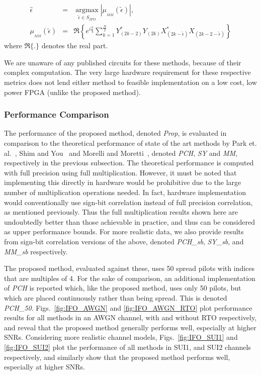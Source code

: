\begin{eqnarray}
\label{equ:MM}
\hat{\epsilon} &=& \underset{\tilde{\epsilon} \in S_{IFO}}{\operatorname{argmax}} \left| \mu_{_{MM}}(\tilde{\epsilon}) \right|,	 \nonumber \\
\mu_{_{MM}}(\tilde{\epsilon}) &=& \Re{\left\{e^{i\frac{\pi}{4}} \sum_{k=1}^{\frac{N}{2}} Y^{*}_{(2k-2)} Y_{(2k)}  X^{*}_{(2k-\tilde{\epsilon})}  X_{(2k-2-\tilde{\epsilon})}\right\}}
\end{eqnarray}
where $\Re{\{.\}}$ denotes the real part.

We are unaware of any published circuits for these methods, because of their complex computation. The very large hardware requirement for these respective metrics does not lend either method to feasible implementation on a low cost, low power FPGA (unlike the proposed method).

\subsubsection{Performance Comparison}

The performance of the proposed method, denoted \emph{Prop}, is evaluated in comparison to the theoretical performance of state of the art methods by Park et. al.~\cite{Park2002}, Shim and You~\cite{Shim2006} and Morelli and Moretti~\cite{Morelli2008}, denoted \emph{PCH}, \emph{SY} and \emph{MM}, respectively in the previous subsection.
The theoretical performance is computed with full precision using full multiplication.
However, it must be noted that implementing this directly in hardware would be prohibitive due to the large number of multiplication operations needed.
In fact, hardware implementation would conventionally use sign-bit correlation instead of full precision correlation, as mentioned previously. Thus the full multiplication results shown here are undoubtedly better than those achievable in practice, and thus can be considered as upper performance bounds.
For more realistic data, we also provide results from sign-bit correlation versions of the above, denoted
\emph{PCH\_sb}, \emph{SY\_sb}, and \emph{MM\_sb} respectively.

The proposed method, evaluated against these, uses 50 spread pilots with indices that are multiples of 4.
For the sake of comparison, an additional implementation of \emph{PCH} is reported which, like the proposed method, uses only 50 pilots, but which are placed continuously rather than being spread. This is denoted \emph{PCH\_50}.
Figs.~\ref{fig:IFO_AWGN} and \ref{fig:IFO_AWGN_RTO} plot performance results for all methods in an AWGN channel, with and without RTO respectively, and reveal that the proposed method generally performs well, especially at higher SNRs. Considering more realistic channel models, Figs.~\ref{fig:IFO_SUI1} and \ref{fig:IFO_SUI2} plot the performance of all methods in SUI1, and SUI2 channels respectively, and similarly show that the proposed method performs well, especially at higher SNRs.


